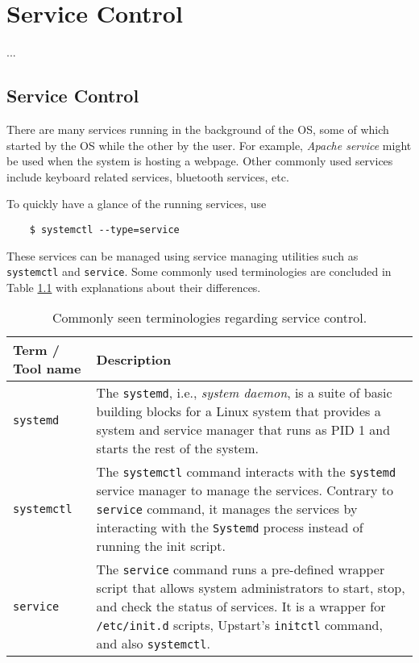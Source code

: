 \chapter{Service Control}
...
\section{Service Control} \label{ch:sa:sec:sc}

There are many services running in the background of the OS, some of which started by the OS while the other by the user. For example, \textit{Apache service} might be used when the system is hosting a webpage. Other commonly used services include keyboard related services, bluetooth services, etc.

To quickly have a glance of the running services, use
\begin{lstlisting}
	$ systemctl --type=service
\end{lstlisting}

These services can be managed using service managing utilities such as \verb|systemctl| and \verb|service|. Some commonly used terminologies are concluded in Table \ref{ch:sa:tab:servicecontroltools} with explanations about their differences.

\begin{table}
	\centering \caption{Commonly seen terminologies regarding service control.}\label{ch:sa:tab:servicecontroltools}
	\begin{tabularx}{\textwidth}{lX}
		\hline
		Term / Tool name & Description \\ \hline
		\verb|systemd| & The \verb|systemd|, i.e., \textit{system daemon}, is a suite of basic building blocks for a Linux system that provides a system and service manager that runs as PID 1 and starts the rest of the system.  \\ \hdashline
		\verb|systemctl| & The \verb|systemctl| command interacts with the \verb|systemd| service manager to manage the services. Contrary to \verb|service| command, it manages the services by interacting with the \verb|Systemd| process instead of running the init script.  \\ \hdashline
		\verb|service| & The \verb|service| command runs a pre-defined wrapper script that allows system administrators to start, stop, and check the status of services. It is a wrapper for \verb|/etc/init.d| scripts, Upstart's \verb|initctl| command, and also \verb|systemctl|. \\ \hline
	\end{tabularx}
\end{table}

